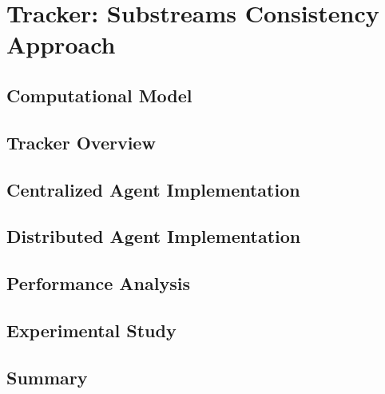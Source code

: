 \chapter{Tracker: Substreams Consistency Approach}

\section{Computational Model}

\section{Tracker Overview}

\section{Centralized Agent Implementation}

\section{Distributed Agent Implementation}

\section{Performance Analysis}

\section{Experimental Study}

\section{Summary}